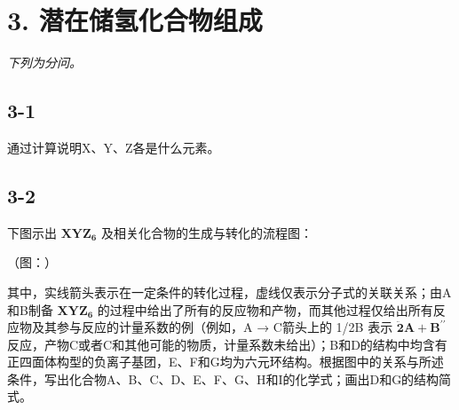 \section*{3. 潜在储氢化合物组成}
\textit{下列为分问。}

\subsection*{3-1}
通过计算说明X、Y、Z各是什么元素。

\subsection*{3-2}
下图⽰出 $\mathbf { X Y Z _ { 6 } }$ 及相关化合物的⽣成与转化的流程图：

（图：）

其中，实线箭头表⽰在⼀定条件的转化过程，虚线仅表⽰分⼦式的关联关系；由A和B制备 $\mathbf { X Y Z _ { 6 } }$ 的过程中给出了所有的反应物和产物，⽽其他过程仅给出所有反应物及其参与反应的计量系数的例（例如，A → C箭头上的 1/2B 表⽰ $\mathbf { \ddot { \boldsymbol { 2 } } A } + \mathbf { B } ^ { \prime \prime }$ 反应，产物C或者C和其他可能的物质，计量系数未给出）；B和D的结构中均含有正四⾯体构型的负离⼦基团，E、F和G均为六元环结构。根据图中的关系与所述条件，写出化合物A、B、C、D、E、F、G、H和I的化学式；画出D和G的结构简式。
